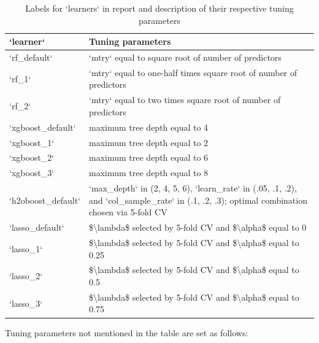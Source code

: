 \documentclass[]{article}
\begin{document}
\begin{table}

\caption{\label{tab:learners}Labels for `learners` in report and description of their respective tuning parameters}
\centering
\begin{tabular}[t]{l|l}
\hline
`learner` & Tuning parameters\\
\hline
`rf\_default` & `mtry` equal to square root of number of predictors\\
\hline
`rf\_1` & `mtry` equal to one-half times square root of number of predictors\\
\hline
`rf\_2` & `mtry` equal to two times square root of number of predictors\\
\hline
`xgboost\_default` & maximum tree depth equal to 4\\
\hline
`xgboost\_1` & maximum tree depth equal to 2\\
\hline
`xgboost\_2` & maximum tree depth equal to 6\\
\hline
`xgboost\_3` & maximum tree depth equal to 8\\
\hline
`h2oboost\_default` & `max\_depth` in (2, 4, 5, 6), `learn\_rate` in (.05, .1, .2), and `col\_sample\_rate` in (.1, .2, .3); optimal combination chosen via 5-fold CV\\
\hline
`lasso\_default` & \$\textbackslash{}lambda\$ selected by 5-fold CV and \$\textbackslash{}alpha\$ equal to 0\\
\hline
`lasso\_1` & \$\textbackslash{}lambda\$ selected by 5-fold CV and \$\textbackslash{}alpha\$ equal to 0.25\\
\hline
`lasso\_2` & \$\textbackslash{}lambda\$ selected by 5-fold CV and \$\textbackslash{}alpha\$ equal to 0.5\\
\hline
`lasso\_3` & \$\textbackslash{}lambda\$ selected by 5-fold CV and \$\textbackslash{}alpha\$ equal to 0.75\\
\hline
\end{tabular}
\end{table}

Tuning parameters not mentioned in the table are set as follows:
\end{document}

